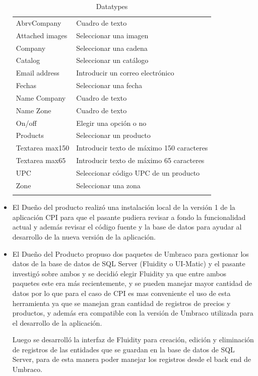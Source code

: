 \begin{itemize}
\begin{longtable}{  l | l  }
    AbrvCompany & Cuadro de texto \\
    Attached images & Seleccionar una imagen \\
    Company & Seleccionar una cadena \\
    Catalog & Seleccionar un catálogo \\
    Email address & Introducir un correo electrónico \\
    Fechas & Seleccionar una fecha \\
    Name Company & Cuadro de texto \\
    Name Zone & Cuadro de texto \\
    On/off & Elegir una opción o no \\
    Products & Seleccionar un producto \\
    Textarea max150 & Introducir texto de máximo 150 caracteres \\
    Textarea max65 & Introducir texto de máximo 65 caracteres \\
    UPC & Seleccionar código UPC de un producto \\
    Zone  & Seleccionar una zona \\
    \hline
 
    \caption{Datatypes}
    \label{table:datatypes}
 \end{longtable}


  \item El Dueño del producto realizó una instalación local de la versión 1 de la aplicación CPI para que el pasante pudiera revisar a fondo la funcionalidad actual y además revisar el código fuente y la base de datos para ayudar al desarrollo de la nueva versión de la aplicación.
  \item El Dueño del Producto propuso dos paquetes de Umbraco para gestionar los datos de la base de datos de SQL Server (Fluidity o UI-Matic) y el pasante investigó sobre ambos y se decidió elegir Fluidity ya que entre ambos paquetes este era más recientemente, y se pueden manejar mayor cantidad de datos por lo que para el caso de CPI es mas conveniente el uso de esta herramienta ya que se manejan gran cantidad de registros de precios y productos,  y además era compatible con la versión de Umbraco utilizada para el desarrollo de la aplicación.
  
  Luego se desarrolló la interfaz de Fluidity para creación, edición y eliminación de registros de las entidades que se guardan en la base de datos de SQL Server, para de esta manera poder manejar los registros desde el back end de Umbraco.
  

\end{itemize}
